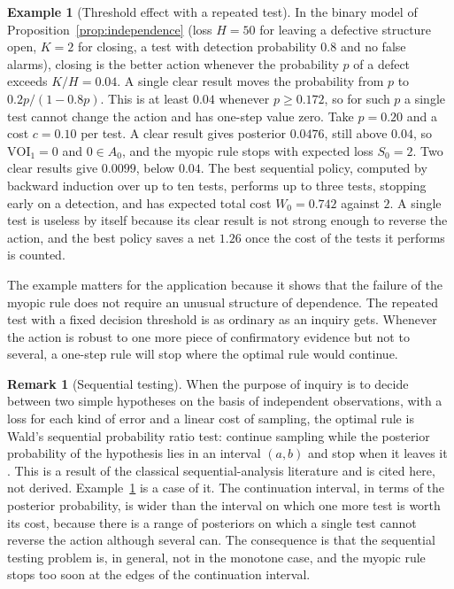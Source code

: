 \documentclass[11pt]{article}
\theoremstyle{plain}
\theoremstyle{definition}
\newtheorem{remark}{Remark}
\newtheorem{example}{Example}
\begin{document}
\begin{example}[Threshold effect with a repeated test]\label{ex:threshold}
In the binary model of Proposition~\ref{prop:independence} (loss $H=50$ for leaving a defective structure open, $K=2$ for closing, a test with detection probability $0.8$ and no false alarms), closing is the better action whenever the probability $p$ of a defect exceeds $K/H=0.04$. A single clear result moves the probability from $p$ to $0.2p/(1-0.8p)$. This is at least $0.04$ whenever $p\ge0.172$, so for such $p$ a single test cannot change the action and has one-step value zero. Take $p=0.20$ and a cost $c=0.10$ per test. A clear result gives posterior $0.0476$, still above $0.04$, so $\mathrm{VOI}_1=0$ and $0\in A_0$, and the myopic rule stops with expected loss $S_0=2$. Two clear results give $0.0099$, below $0.04$. The best sequential policy, computed by backward induction over up to ten tests, performs up to three tests, stopping early on a detection, and has expected total cost $W_0=0.742$ against $2$. A single test is useless by itself because its clear result is not strong enough to reverse the action, and the best policy saves a net $1.26$ once the cost of the tests it performs is counted.
\end{example}

The example matters for the application because it shows that the failure of the myopic rule does not require an unusual structure of dependence. The repeated test with a fixed decision threshold is as ordinary as an inquiry gets. Whenever the action is robust to one more piece of confirmatory evidence but not to several, a one-step rule will stop where the optimal rule would continue.

\begin{remark}[Sequential testing]\label{rem:sprt}
When the purpose of inquiry is to decide between two simple hypotheses on the basis of independent observations, with a loss for each kind of error and a linear cost of sampling, the optimal rule is Wald's sequential probability ratio test: continue sampling while the posterior probability of the hypothesis lies in an interval $(a,b)$ and stop when it leaves it \cite{wald1948optimum,arrow1949bayes}. This is a result of the classical sequential-analysis literature and is cited here, not derived. Example~\ref{ex:threshold} is a case of it. The continuation interval, in terms of the posterior probability, is wider than the interval on which one more test is worth its cost, because there is a range of posteriors on which a single test cannot reverse the action although several can. The consequence is that the sequential testing problem is, in general, not in the monotone case, and the myopic rule stops too soon at the edges of the continuation interval.
\end{remark}
\end{document}
